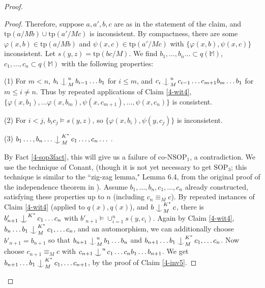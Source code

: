 \documentclass[12pt]{amsart}
\theoremstyle{definition}
\def\Ind#1#2{#1\setbox0=\hbox{$#1x$}\kern\wd0\hbox to 0pt{\hss$#1\mid$\hss}
\lower.9\ht0\hbox to 0pt{\hss$#1\smile$\hss}\kern\wd0}
\def\ind{\mathop{\mathpalette\Ind{}}}
\begin{document}
\begin{proof}
\begin{proof}
   Therefore, suppose $a, a', b, c$ are as in the statement of the claim, and $\mathrm{tp}(a/Mb) \cup \mathrm{tp}(a'/Mc)$ is inconsistent. By compactness, there are some $\varphi(x, b) \in \mathrm{tp}(a/Mb)$ and  $\psi(x, c) \in \mathrm{tp}(a'/Mc)$ with $\{\varphi(x, b) , \psi(x, c)\} $ inconsistent. Let $s(y, z) = \mathrm{tp}(bc/M)$. We find $b_{1}, \ldots, b_{n} \ldots \subset q(\mathbb{M})$, $c_{1}, \ldots, c_{n} \subset q(\mathbb{M})$ with the following properties:


   (1) For $m < n$, $b_{i} \ind_{M}^{u} b_{i-1} \ldots b_{1}$ for $i \leq m$, and $c_{i} \ind_{M}^{u} c_{i-1} \ldots c_{m+1}b_{m} \ldots b_{1}$ for $m \leq i \neq n$. Thus by repeated applications of Claim \ref{4-wit4}, $\{\varphi(x, b_{1}), \ldots \varphi(x, b_{m}), \psi(x, c_{m+1}), \ldots, \psi(x,c_{n})\}$ is consistent.

   (2) For $i < j$, $b_{i}c_{j} \models s(y, z)$, so $\{\varphi(x, b_{i}), \psi(y, c_{j})\}$ is inconsistent.

   (3) $b_{1} \ldots, b_{n} \ldots \ind_{M}^{K^{*}} c_{1} \ldots, c_{n} \ldots$ .


By Fact \ref{4-sop3fact}, this will give us a failure of co-$\mathrm{NSOP}_{1}$, a contradiction. We use the technique of Conant, \cite{Co15} (though it is not yet necessary to get $\mathrm{SOP}_{3}$; this technique is similar to the ``zig-zag lemma," Lemma 6.4, from the original proof of the independence theorem in \cite{KR17}). Assume $b_{1}, \ldots, b_{n}, c_{1}, \ldots, c_{n}$ already constructed, satisfying these properties up to $n$ (including $c_{n} \equiv_{M} c$). By repeated instances of Claim \ref{4-wit4} (applied to $q(x), q(x)$), and $b \ind^{K^{*}}_{M} c$, there is $b'_{n+1} \ind^{K^{*}} c_{1} \ldots c_{n}$ with $b'_{n+1} \models \cup_{i =1}^{n} s(y, c_{i})$. Again by Claim \ref{4-wit4}, $b_{n} \ldots b_{1} \ind^{K^{*}}_{M} c_{1}, \ldots c_{n}$, and an automorphism, we can additionally choose $b'_{n+1}=b_{n+1}$ so that $b_{n+1} \ind_{M}^{u} b_{1}\ldots b_{n} $ and $b_{n+1} \ldots b_{1} \ind^{K^{*}}_{M} c_{1}, \ldots c_{n}$. Now choose $c_{n+1} \equiv_{M} c$ with $c_{n+1} \ind^{u} c_{1} \ldots c_{n} b_{1} \ldots b_{n+1}$. We get $b_{n+1} \ldots b_{1} \ind^{K^{*}}_{M} c_{1}, \ldots c_{n+1}$, by the proof of Claim \ref{4-inv5}.
\end{proof}

 


\end{proof}
\end{document}
